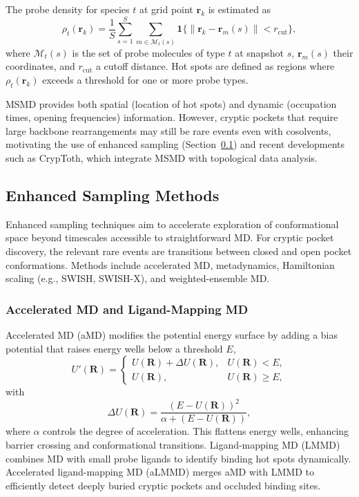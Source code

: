 \documentclass[12pt,a4paper]{article}
\begin{document}
The probe density for species \(t\) at grid point \(\mathbf{r}_k\) is estimated as
\begin{equation}
\rho_t(\mathbf{r}_k) = \frac{1}{S} \sum_{s=1}^{S} \sum_{m \in \mathcal{M}_t(s)} \mathbf{1}\{ \left\| \mathbf{r}_k - \mathbf{r}_{m}(s) \right\| < r_{\mathrm{cut}}\},
\label{eq:probe_density}
\end{equation}
where \(\mathcal{M}_t(s)\) is the set of probe molecules of type \(t\) at snapshot \(s\), \(\mathbf{r}_m(s)\) their coordinates, and \(r_{\mathrm{cut}}\) a cutoff distance. Hot spots are defined as regions where \(\rho_t(\mathbf{r}_k)\) exceeds a threshold for one or more probe types.

MSMD provides both spatial (location of hot spots) and dynamic (occupation times, opening frequencies) information. However, cryptic pockets that require large backbone rearrangements may still be rare events even with cosolvents, motivating the use of enhanced sampling (Section~\ref{sec:enhanced_sampling}) and recent developments such as CrypToth, which integrate MSMD with topological data analysis.\cite{CH5_koseki2025cryptoth,CH5_Gasparikova2025}

\subsection{Enhanced Sampling Methods}
\label{sec:enhanced_sampling}

Enhanced sampling techniques aim to accelerate exploration of conformational space beyond timescales accessible to straightforward MD. For cryptic pocket discovery, the relevant rare events are transitions between closed and open pocket conformations. Methods include accelerated MD, metadynamics, Hamiltonian scaling (e.g., SWISH, SWISH-X), and weighted-ensemble MD.\cite{CH5_Kuzmanic2020,CH5_Borsatto2024SWISHX,CH5_zhang2026decrypting}

\subsubsection{Accelerated MD and Ligand-Mapping MD}

Accelerated MD (aMD) modifies the potential energy surface by adding a bias potential that raises energy wells below a threshold \(E\),
\begin{equation}
U'(\mathbf{R}) =
\begin{cases}
U(\mathbf{R}) + \Delta U(\mathbf{R}), & U(\mathbf{R}) < E, \\
U(\mathbf{R}), & U(\mathbf{R}) \ge E,
\end{cases}
\end{equation}
with
\begin{equation}
\Delta U(\mathbf{R}) = \frac{(E - U(\mathbf{R}))^2}{\alpha + (E - U(\mathbf{R}))},
\end{equation}
where \(\alpha\) controls the degree of acceleration. This flattens energy wells, enhancing barrier crossing and conformational transitions. Ligand-mapping MD (LMMD) combines MD with small probe ligands to identify binding hot spots dynamically. Accelerated ligand-mapping MD (aLMMD) merges aMD with LMMD to efficiently detect deeply buried cryptic pockets and occluded binding sites.\cite{CH5_Ng2022aLMMD}
\end{document}
